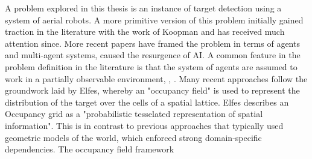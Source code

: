 \workinprogress

A problem explored in this thesis is an instance of target detection using a system of aerial robots. A more primitive version of this problem initially gained traction in the literature with the work of Koopman \cite{KoopmanTheoryOfSearchTargetDetection} and has received much attention since. More recent papers have framed the problem in terms of agents and multi-agent systems, caused the resurgence of AI. A common feature in the problem definition in the literature is that the system of agents are assumed to work in a partially observable environment\cite{Symington2010ProbabilisticUAVs}, \cite{Chung2008Multi-agentFramework}, \cite{WongMulti-vehicleTargets}. Many recent approaches follow the groundwork laid by Elfes\cite{ElfesUsingNavigation}, whereby an "occupancy field" is used to represent the distribution of the target over the cells of a spatial lattice. Elfes describes an Occupancy grid as a "probabilistic tesselated representation of spatial information". This is in contrast to previous approaches that typically used geometric models of the world, which enforced strong domain-specific dependencies. The occupancy field framework 
\par

